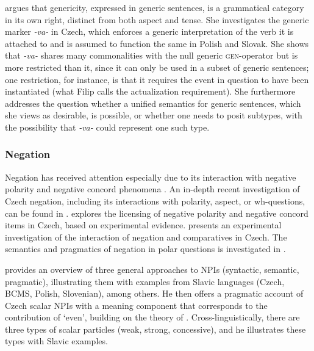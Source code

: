 \documentclass[output=paper,colorlinks,citecolor=brown]{langscibook}
\begin{document}
 argues that genericity, expressed in generic sentences, is a grammatical category in its own right, distinct from both aspect and tense. She investigates the generic marker \textit{-va-} in Czech, which enforces a generic interpretation of the verb it is attached to and is assumed to function the same in Polish and Slovak. She shows that \textit{-va-} shares many commonalities with the null generic \textsc{gen}-operator but is more restricted than it, since it can only be used in a subset of generic sentences; one restriction, for instance, is that it requires the event in question to have been instantiated (what Filip calls the actualization requirement). She furthermore addresses the question whether a unified semantics for generic sentences, which she views as desirable, is possible, or whether one needs to posit subtypes, with the possibility that \textit{-va-} could represent one such type.

\subsubsection{Negation} Negation has received attention especially due to its interaction with negative polarity and negative concord phenomena \citep{Progovac1993a,Blaszczak2001,gajic16a}. An in-depth recent investigation of Czech negation, including its interactions with polarity, aspect, or wh-questions, can be found in \citet{docekal15}. \citet{Docekal2020,Docekal2025} explores the licensing of negative polarity and negative concord items in Czech, based on experimental evidence. \citet{Safratova2020} presents an experimental investigation of the interaction of negation and comparatives in Czech. The semantics and pragmatics of negation in polar questions is investigated in \citet{Stankova.Simik2025}.

\citet{chapters/03_docekal} provides an overview of three general approaches to NPIs (syntactic, semantic, pragmatic), illustrating them with examples from Slavic languages (Czech, BCMS, Polish, Slovenian), among others. He then offers a pragmatic account of Czech scalar NPIs with a meaning component that corresponds to the contribution of `even', building on the theory of \citet{Crnic2011}. Cross-linguistically, there are three types of scalar particles (weak, strong, concessive), and he illustrates these types with Slavic examples. 
\end{document}
